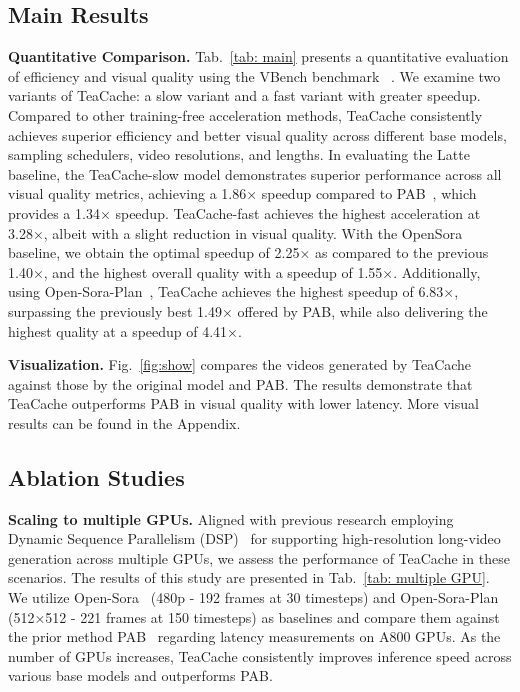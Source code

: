 \subsection{Main Results}

\textbf{Quantitative Comparison.} Tab.~\ref{tab: main} presents a quantitative evaluation of efficiency and visual quality using the VBench benchmark ~\cite{huang2024vbench}. We examine two variants of TeaCache: a slow variant and a fast variant with greater speedup. Compared to other training-free acceleration methods, TeaCache consistently achieves superior efficiency and better visual quality across different base models, sampling schedulers, video resolutions, and lengths. In evaluating the Latte~\cite{ma2024latte} baseline, the TeaCache-slow model demonstrates superior performance across all visual quality metrics, achieving a 1.86× speedup compared to PAB~\cite{zhao2024real}, which provides a 1.34× speedup. TeaCache-fast achieves the highest acceleration at 3.28×, albeit with a slight reduction in visual quality. With the OpenSora~\cite{Open-Sora} baseline, we obtain the optimal speedup of 2.25× as compared to the previous 1.40×, and the highest overall quality with a speedup of 1.55×. Additionally, using Open-Sora-Plan~\cite{Open-Sora-Plan}, TeaCache achieves the highest speedup of 6.83×, surpassing the previously best 1.49× offered by PAB, while also delivering the highest quality at a speedup of 4.41×.


\textbf{Visualization.} Fig.~\ref{fig:show} compares the videos generated by TeaCache against those by the original model and  PAB. The results demonstrate that TeaCache outperforms PAB in visual quality with lower latency. More visual results can be found in the Appendix.

\subsection{Ablation Studies}




\textbf{Scaling to multiple GPUs.} Aligned with previous research employing Dynamic Sequence Parallelism (DSP)~\cite{zhao2024real} for supporting high-resolution long-video generation across multiple GPUs, we assess the performance of TeaCache in these scenarios.  
The results of this study are presented in Tab.~\ref{tab: multiple GPU}. We utilize Open-Sora~\cite{Open-Sora} (480p - 192 frames at 30 timesteps) and Open-Sora-Plan~\cite{Open-Sora-Plan} (512×512 - 221 frames at 150 timesteps) as baselines and compare them against the prior method PAB~\cite{zhao2024real} regarding latency measurements on A800 GPUs. As the number of GPUs increases, TeaCache consistently improves inference speed across various base models and outperforms PAB. 


